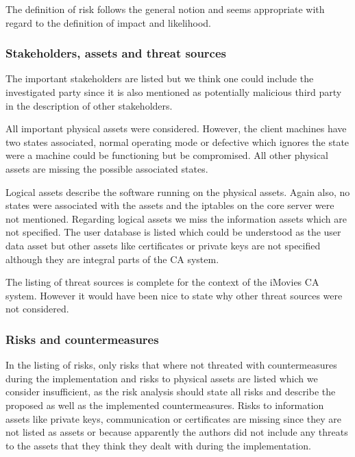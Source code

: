 \documentclass{article}
\begin{document}
The definition of risk follows the general notion and seems appropriate with regard to the definition of impact and likelihood.

\subsubsection{Stakeholders, assets and threat sources}
The important stakeholders are listed but we think one could include the investigated party since it is also mentioned as potentially malicious third party in the description of other stakeholders.

All important physical assets were considered. However, the client machines have two states associated, normal operating mode or defective which ignores the state were a machine could be functioning but be compromised. All other physical assets are missing the possible associated states.

Logical assets describe the software running on the physical assets. Again also, no states were associated with the assets and the iptables on the core server were not mentioned. Regarding logical assets we miss the information assets which are not specified. The user database is listed which could be understood as the user data asset but other assets like certificates or private keys are not specified although they are integral parts of the CA system.

The listing of threat sources is complete for the context of the iMovies CA system. However it would have been nice to state why other threat sources were not considered.

\subsubsection{Risks and countermeasures}
In the listing of risks, only risks that where not threated with countermeasures during the implementation and risks to physical assets are listed which we consider insufficient, as the risk analysis should state all risks and describe the proposed as well as the implemented countermeasures. Risks to information assets like private keys, communication or certificates are missing since they are not listed as assets or because apparently the authors did not include any threats to the assets that they think they dealt with during the implementation.
\end{document}
